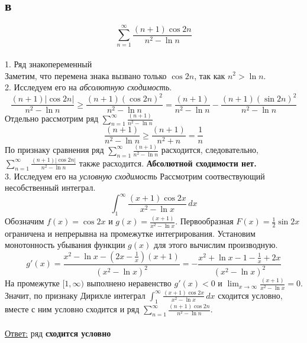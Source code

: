 \documentclass[a5paper, 10pt]{article}
\theoremstyle{definition}
\theoremstyle{plain}
\theoremstyle{remark}
\begin{document}
\subsection{в}
\begin{equation}
\sum \limits_{n = 1}^{\infty} \frac{\left(n+1\right) \cos 2n}{n^2-\ln n}
\end{equation}
\\
1. Ряд знакопеременный\\
Заметим, что перемена знака вызвано только $\cos 2n$, так как $n^2 > \ln n$.\\
2. Исследуем его на \textit{абсолютную сходимость}. \\
\begin{equation}
\frac{\left(n+1\right) \left| \cos 2n \right|}{n^2-\ln n} \geq \frac{\left(n+1\right) \left( \cos 2n \right)^2}{n^2-\ln n}=
\frac{\left(n+1\right)}{n^2-\ln n} - \frac{\left(n+1\right) \left( \sin 2n \right)^2}{n^2-\ln n}
\end{equation}
Отдельно рассмотрим ряд $\sum \limits_{n = 1}^{\infty} \frac{\left(n+1\right)}{n^2-\ln n}$
\begin{equation}
\frac{\left(n+1\right)}{n^2-\ln n} \geq \frac{\left(n+1\right)}{n^2+ n}=  \frac{1}{n}
\end{equation}
По признаку сравнения ряд $\sum \limits_{n = 1}^{\infty} \frac{\left(n+1\right)}{n^2-\ln n}$ расходится, следовательно, $\sum \limits_{n = 1}^{\infty} \frac{\left(n+1\right) \left| \cos 2n \right|}{n^2-\ln n}$ также расходится. \textbf{Абсолютной сходимости нет.}\\
3. Исследуем его на \textit{условную сходимость} Рассмотрим соотвествующий несобственный интеграл. \\
\begin{equation}
\int_{1}^{\infty}\frac{\left(x+1\right)\cos 2x}{x^2-\ln x} \, dx
\end{equation}
Обозначим $f(x) =\cos 2x $ и $g(x) =\frac{(x+1)}{x^2-\ln x}$. Первообразная $F(x) = \frac{1}{2} \sin 2x$ ограничена и непрерывна на промежутке интегрирования. Установим монотонность убывания функции $g(x)$ для этого вычислим производную.
\begin{equation}
g'(x) = \frac{x^2-\ln x - \left( 2x - \frac{1}{x}\right) (x+1)}{\left( x^2-\ln x \right)^2 }= - \frac{x^2+\ln x-1-\frac{1}{x} + 2x}{\left( x^2-\ln x \right)^2}
\end{equation}
На промежутке $[1, \infty)$ выполнено неравенство $g'(x) < 0$ и $\lim_{x \to \infty}\frac{(x+1)}{x^2-\ln x} = 0 $. Значит, по признаку Дирихле интеграл $\int_{1}^{\infty}\frac{\left(x+1\right)\cos 2x}{x^2-\ln x} \, dx$ сходится условно, вместе с ним условно сходится и ряд $\sum \limits_{n = 1}^{\infty} \frac{\left(n+1\right) \cos 2n}{n^2-\ln n}$.
\\\\
\underline{Ответ:} ряд  \textbf{сходится условно}
\end{document}

